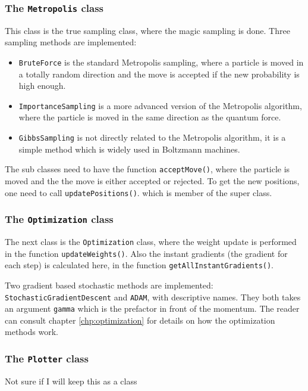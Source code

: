 \subsubsection{The \texttt{Metropolis} class}
This class is the true sampling class, where the magic sampling is done. Three sampling methods are implemented:
\begin{itemize}
	\item \texttt{BruteForce} is the standard Metropolis sampling, where a particle is moved in a totally random direction and the move is accepted if the new probability is high enough.

	\item \texttt{ImportanceSampling} is a more advanced version of the Metropolis algorithm, where the particle is moved in the same direction as the quantum force.
	
	\item \texttt{GibbsSampling} is not directly related to the Metropolis algorithm, it is a simple method which is widely used in Boltzmann machines.
\end{itemize}
The sub classes need to have the function \texttt{acceptMove()}, where the particle is moved and the the move is either accepted or rejected. To get the new positions, one need to call \texttt{updatePositions()}. which is member of the super class. 

\subsubsection{The \texttt{Optimization} class}
The next class is the \texttt{Optimization} class, where the weight update is performed in the function \texttt{updateWeights()}. Also the instant gradients (the gradient for each step) is calculated here, in the function \texttt{getAllInstantGradients()}.

Two gradient based stochastic methods are implemented: \texttt{StochasticGradientDescent} and \texttt{ADAM}, with descriptive names. They both takes an argument \texttt{gamma} which is the prefactor in front of the momentum. The reader can consult chapter \eqref{chp:optimization} for details on how the optimization methods work. 

\subsubsection{The \texttt{Plotter} class}
Not sure if I will keep this as a class

